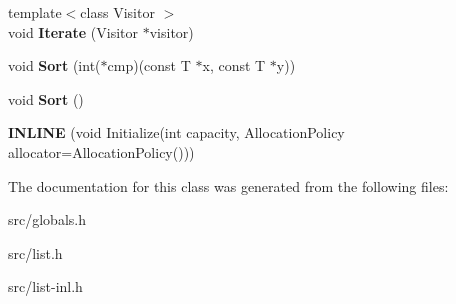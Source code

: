 \begin{DoxyCompactItemize}
\item 
\hypertarget{classv8_1_1internal_1_1_list_aabc219bc26a394d0a821b95474c33694}{}{\footnotesize template$<$class Visitor $>$ }\\void {\bfseries Iterate} (Visitor $\ast$visitor)\label{classv8_1_1internal_1_1_list_aabc219bc26a394d0a821b95474c33694}

\item 
\hypertarget{classv8_1_1internal_1_1_list_a8437f56923997da6232f89c32fb36822}{}void {\bfseries Sort} (int($\ast$cmp)(const T $\ast$x, const T $\ast$y))\label{classv8_1_1internal_1_1_list_a8437f56923997da6232f89c32fb36822}

\item 
\hypertarget{classv8_1_1internal_1_1_list_ac4f0b816ee55aeccd8f9cba78540a79e}{}void {\bfseries Sort} ()\label{classv8_1_1internal_1_1_list_ac4f0b816ee55aeccd8f9cba78540a79e}

\item 
\hypertarget{classv8_1_1internal_1_1_list_af3f5d74dbc25c70c48a89b20e085b6e4}{}{\bfseries I\+N\+L\+I\+N\+E} (void Initialize(int capacity, Allocation\+Policy allocator=Allocation\+Policy()))\label{classv8_1_1internal_1_1_list_af3f5d74dbc25c70c48a89b20e085b6e4}

\end{DoxyCompactItemize}


The documentation for this class was generated from the following files\+:\begin{DoxyCompactItemize}
\item 
src/globals.\+h\item 
src/list.\+h\item 
src/list-\/inl.\+h\end{DoxyCompactItemize}
